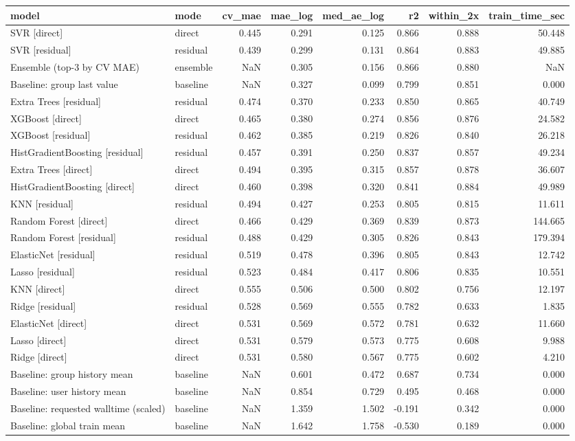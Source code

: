 \begin{tabular}{llrrrrrr}
\toprule
model & mode & cv_mae & mae_log & med_ae_log & r2 & within_2x & train_time_sec \\
\midrule
SVR [direct] & direct & 0.445 & 0.291 & 0.125 & 0.866 & 0.888 & 50.448 \\
SVR [residual] & residual & 0.439 & 0.299 & 0.131 & 0.864 & 0.883 & 49.885 \\
Ensemble (top-3 by CV MAE) & ensemble & NaN & 0.305 & 0.156 & 0.866 & 0.880 & NaN \\
Baseline: group last value & baseline & NaN & 0.327 & 0.099 & 0.799 & 0.851 & 0.000 \\
Extra Trees [residual] & residual & 0.474 & 0.370 & 0.233 & 0.850 & 0.865 & 40.749 \\
XGBoost [direct] & direct & 0.465 & 0.380 & 0.274 & 0.856 & 0.876 & 24.582 \\
XGBoost [residual] & residual & 0.462 & 0.385 & 0.219 & 0.826 & 0.840 & 26.218 \\
HistGradientBoosting [residual] & residual & 0.457 & 0.391 & 0.250 & 0.837 & 0.857 & 49.234 \\
Extra Trees [direct] & direct & 0.494 & 0.395 & 0.315 & 0.857 & 0.878 & 36.607 \\
HistGradientBoosting [direct] & direct & 0.460 & 0.398 & 0.320 & 0.841 & 0.884 & 49.989 \\
KNN [residual] & residual & 0.494 & 0.427 & 0.253 & 0.805 & 0.815 & 11.611 \\
Random Forest [direct] & direct & 0.466 & 0.429 & 0.369 & 0.839 & 0.873 & 144.665 \\
Random Forest [residual] & residual & 0.488 & 0.429 & 0.305 & 0.826 & 0.843 & 179.394 \\
ElasticNet [residual] & residual & 0.519 & 0.478 & 0.396 & 0.805 & 0.843 & 12.742 \\
Lasso [residual] & residual & 0.523 & 0.484 & 0.417 & 0.806 & 0.835 & 10.551 \\
KNN [direct] & direct & 0.555 & 0.506 & 0.500 & 0.802 & 0.756 & 12.197 \\
Ridge [residual] & residual & 0.528 & 0.569 & 0.555 & 0.782 & 0.633 & 1.835 \\
ElasticNet [direct] & direct & 0.531 & 0.569 & 0.572 & 0.781 & 0.632 & 11.660 \\
Lasso [direct] & direct & 0.531 & 0.579 & 0.573 & 0.775 & 0.608 & 9.988 \\
Ridge [direct] & direct & 0.531 & 0.580 & 0.567 & 0.775 & 0.602 & 4.210 \\
Baseline: group history mean & baseline & NaN & 0.601 & 0.472 & 0.687 & 0.734 & 0.000 \\
Baseline: user history mean & baseline & NaN & 0.854 & 0.729 & 0.495 & 0.468 & 0.000 \\
Baseline: requested walltime (scaled) & baseline & NaN & 1.359 & 1.502 & -0.191 & 0.342 & 0.000 \\
Baseline: global train mean & baseline & NaN & 1.642 & 1.758 & -0.530 & 0.189 & 0.000 \\
\bottomrule
\end{tabular}
